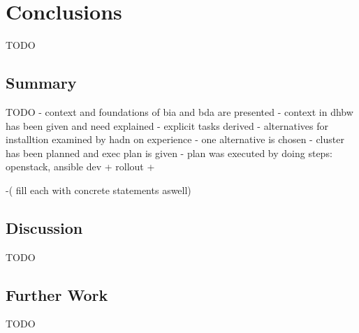 \chapter{Conclusions}
\label{chap:conc}

TODO

\section{Summary}

TODO
- context and foundations of bia and bda are presented
- context in dhbw has been given and need explained
- explicit tasks derived
- alternatives for installtion examined by hadn on experience
- one alternative is chosen
- cluster has been planned and exec plan is given
- plan was executed by doing steps: openstack, ansible dev + rollout + 

-( fill each with concrete statements aswell)

\section{Discussion}

TODO

\section{Further Work}

TODO
